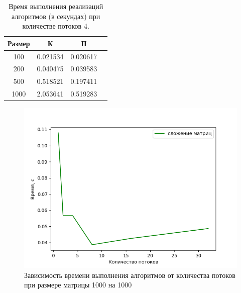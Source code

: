 \begin{table}[ht]
    \caption{\centering Время выполнения реализаций алгоритмов (в секундах) при количестве потоков 4.}
    \centering
    \begin{tabular}{|c|c|c|c|}
    \hline
    Размер & К      & П     \\ \hline
    100    & 0.021534 & 0.020617 \\ \hline
    200    & 0.040475 & 0.039583  \\ \hline
    500    & 0.518521  & 0.197411  \\ \hline
    1000    & 2.053641  & 0.519283  \\ \hline
 
    \end{tabular}
    \label{tab:time_best}
\end{table}

\begin{figure}
    \centering
    \includegraphics[scale=0.65]{ths.png}
    \caption{Зависимость времени выполнения алгоритмов от количества потоков при размере матрицы 1000 на 1000}
    \label{img:plot_best}
\end{figure}



